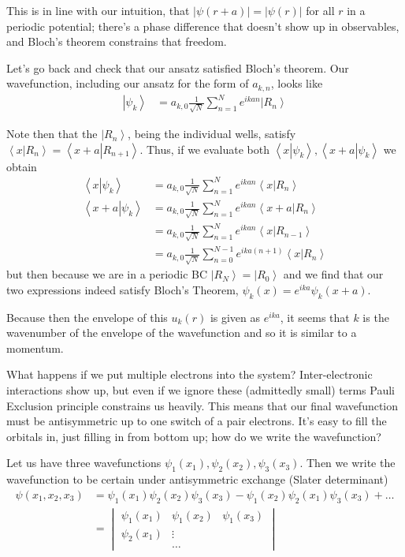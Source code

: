 \documentclass[10pt]{report}
\newcommand{\ket}[1]{\left|#1\right>}
\newcommand{\dotp}[2]{\left<#1\left.\right|#2\right>}
\newcommand{\abs}[1]{\left|#1\right|}
\begin{document}
This is in line with our intuition, that $\abs{\psi(r+a)} = \abs{\psi(r)}$ for all $r$ in a periodic potential; there's a phase difference that doesn't show up in observables, and Bloch's theorem constrains that freedom.

Let's go back and check that our ansatz satisfied Bloch's theorem. Our wavefunction, including our ansatz for the form of $a_{k,n}$, looks like
\begin{align}
    \ket{\psi_k} &= a_{k,0}\frac{1}{\sqrt{N}}\sum\limits_{n=1}^{N}e^{ikan}\ket{R_n}
\end{align}

Note then that the $\ket{R_n}$, being the individual wells, satisfy $\dotp{x}{R_n} = \dotp{x+a}{R_{n+1}}$. Thus, if we evaluate both $\dotp{x}{\psi_k}, \dotp{x+a}{\psi_k}$ we obtain
\begin{align}
    \dotp{x}{\psi_k} &= a_{k,0}\frac{1}{\sqrt{N}}\sum\limits_{n=1}^{N}e^{ikan}\dotp{x}{R_n}\\
    \dotp{x+a}{\psi_k} &=a_{k,0}\frac{1}{\sqrt{N}}\sum\limits_{n=1}^{N}e^{ikan}\dotp{x+a}{R_n}\\ 
    &= a_{k,0}\frac{1}{\sqrt{N}}\sum\limits_{n=1}^{N}e^{ikan}\dotp{x}{R_{n-1}}\\ 
    &= a_{k,0}\frac{1}{\sqrt{N}}\sum\limits_{n=0}^{N-1}e^{ika(n + 1)}\dotp{x}{R_n}
\end{align}
but then because we are in a periodic BC $\ket{R_{N}} = \ket{R_0}$ and we find that our two expressions indeed satisfy Bloch's Theorem, $\psi_k(x) = e^{ika}\psi_k(x+a)$. 

Because then the envelope of this $u_k(r)$ is given as $e^{ika}$, it seems that $k$ is the wavenumber of the envelope of the wavefunction and so it is similar to a momentum.

What happens if we put multiple electrons into the system? Inter-electronic interactions show up, but even if we ignore these (admittedly small) terms Pauli Exclusion principle constrains us heavily. This means that our final wavefunction must be antisymmetric up to one switch of a pair electrons. It's easy to fill the orbitals in, just filling in from bottom up; how do we write the wavefunction?

Let us have three wavefunctions $\psi_1(x_1), \psi_2(x_2), \psi_3(x_3)$. Then we write the wavefunction to be certain under antisymmetric exchange (Slater determinant)
\begin{align}
    \psi(x_1, x_2, x_3) &= \psi_1(x_1)\psi_2(x_2)\psi_3(x_3) - \psi_1(x_2)\psi_2(x_1)\psi_3(x_3) +\dots\\
    &= \begin{vmatrix} \psi_1(x_1) &\psi_1(x_2)&\psi_1(x_3)\\ \psi_2(x_1) &\vdots&\\ & \dots & \end{vmatrix}
\end{align}
\end{document}
